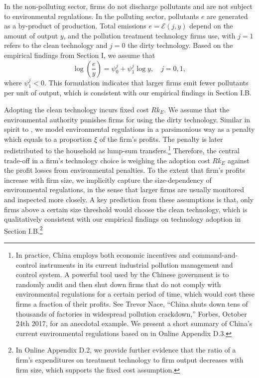 \documentclass[AEJ]{AEA}
\begin{document}
In the non-polluting sector, firms do not discharge pollutants and are not subject to environmental regulations. In the polluting sector, pollutants $e$ are generated as a by-product of production. Total emissions $e = \mathcal{E}(j,y)$ depend on the amount of output $y$, and the pollution treatment technology firms use, with $j = 1$ refers to the clean technology and $j = 0$ the dirty technology. Based on the empirical findings from Section I, we assume that
\begin{equation}
\label{eq:intensity_size}
    \log\left(\frac{e}{y}\right) = \psi_0^{j}+ \psi_1^{j} \log y, \quad j = 0,1,
\end{equation}
where $\psi_1^{j}<0$. This formulation indicates that larger firms emit fewer pollutants per unit of output, which is consistent with our empirical findings in Section I.B.

Adopting the clean technology incurs fixed cost $R k_E$. We assume that the environmental authority punishes firms for using the dirty technology. Similar in spirit to \citet{ShapiroWalker:2015}, we model environmental regulations in a parsimonious way as a penalty which equals to a proportion $\xi$ of the firm's profits. The penalty is later redistributed to the household as lump-sum transfers.\footnote{In practice, China employs both economic incentives and command-and-control instruments in its current industrial pollution management and control system. A powerful tool used by the Chinese government is to randomly audit and then shut down firms that do not comply with environmental regulations for a certain period of time, which would cost these firms a fraction of their profits. See Trevor Nace, ``China shuts down tens of thousands of factories in widespread pollution crackdown,'' Forbes, October 24th 2017, for an anecdotal example.  We present a short summary of China's current environmental regulations based on \citet{Lin:2013} in Online Appendix D.3.} Therefore, the central trade-off in a firm's technology choice is weighing the adoption cost $R k_E$ against the profit losses from environmental penalties. To the extent that firm's profits increase with firm size, we implicitly capture the size-dependency of environmental regulations, in the sense that larger firms are usually monitored and inspected more closely. A key prediction from these assumptions is that, only firms above a certain size threshold would choose the clean technology, which is qualitatively consistent with our empirical findings on technology adoption in Section I.B.\footnote{In Online Appendix D.2, we provide further evidence that the ratio of a firm's expenditures on treatment technology to firm output decreases with firm size, which supports the fixed cost assumption.}
\end{document}

